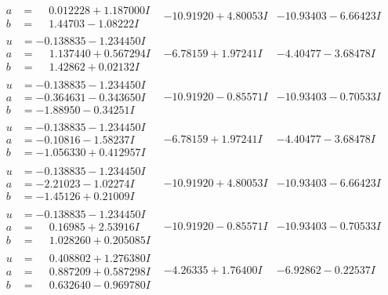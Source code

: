 \documentclass[1p]{elsarticle_modified}
\theoremstyle{definition}
\begin{document}
$$\begin{array}{c|c|c}
\begin{aligned}
a &= \phantom{-}0.012228 + 1.187000 I \\
b &= \phantom{-}1.44703 - 1.08222 I\end{aligned}
 & -10.91920 + 4.80053 I & -10.93403 - 6.66423 I \\ \hline\begin{aligned}
u &= -0.138835 - 1.234450 I \\
a &= \phantom{-}1.137440 + 0.567294 I \\
b &= \phantom{-}1.42862 + 0.02132 I\end{aligned}
 & -6.78159 + 1.97241 I & -4.40477 - 3.68478 I \\ \hline\begin{aligned}
u &= -0.138835 - 1.234450 I \\
a &= -0.364631 - 0.343650 I \\
b &= -1.88950 - 0.34251 I\end{aligned}
 & -10.91920 - 0.85571 I & -10.93403 - 0.70533 I \\ \hline\begin{aligned}
u &= -0.138835 - 1.234450 I \\
a &= -0.10816 - 1.58237 I \\
b &= -1.056330 + 0.412957 I\end{aligned}
 & -6.78159 + 1.97241 I & -4.40477 - 3.68478 I \\ \hline\begin{aligned}
u &= -0.138835 - 1.234450 I \\
a &= -2.21023 - 1.02274 I \\
b &= -1.45126 + 0.21009 I\end{aligned}
 & -10.91920 + 4.80053 I & -10.93403 - 6.66423 I \\ \hline\begin{aligned}
u &= -0.138835 - 1.234450 I \\
a &= \phantom{-}0.16985 + 2.53916 I \\
b &= \phantom{-}1.028260 + 0.205085 I\end{aligned}
 & -10.91920 - 0.85571 I & -10.93403 - 0.70533 I \\ \hline\begin{aligned}
u &= \phantom{-}0.408802 + 1.276380 I \\
a &= \phantom{-}0.887209 + 0.587298 I \\
b &= \phantom{-}0.632640 - 0.969780 I\end{aligned}
 & -4.26335 + 1.76400 I & -6.92862 - 0.22537 I \\ \hline\begin{aligned}

\end{aligned}
\end{array}$$
\end{document}
